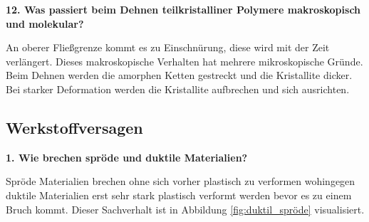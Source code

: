 \noindent\textbf{12. Was passiert beim Dehnen teilkristalliner Polymere makroskopisch und molekular?}\\
\begin{addmargin}[25pt]{0pt}
An oberer Fließgrenze kommt es zu Einschnürung, diese wird mit der Zeit verlängert. Dieses makroskopische Verhalten hat mehrere mikroskopische Gründe. Beim Dehnen werden die amorphen Ketten gestreckt und die Kristallite dicker. Bei starker Deformation werden die Kristallite aufbrechen und sich ausrichten.\\
\end{addmargin}

\subsection{Werkstoffversagen}
\noindent\textbf{1. Wie brechen spröde und duktile Materialien?}\\
\begin{addmargin}[25pt]{0pt}
Spröde Materialien brechen ohne sich vorher plastisch zu verformen wohingegen duktile Materialien erst sehr stark plastisch verformt werden bevor es zu einem Bruch kommt. Dieser Sachverhalt ist in Abbildung \ref{fig:duktil_spröde} visualisiert.\\
\end{addmargin}

